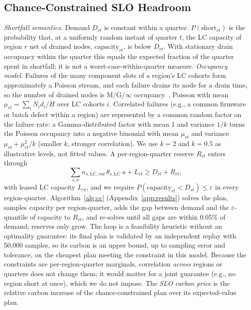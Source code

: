 \documentclass{article} %
\begin{document}
\subsection{Chance-Constrained SLO Headroom}
\label{sec:method_cc}
\emph{Shortfall semantics.} Demand $D_{rt}$ is constant within a quarter. $P(\text{short}_{rt})$ is the probability that, at a uniformly random instant of quarter $t$, the LC capacity of region $r$ net of drained nodes, $\text{capacity}_{rt}$, is below $D_{rt}$. With stationary drain occupancy within the quarter this equals the expected fraction of the quarter spent in shortfall; it is not a worst-case-within-quarter measure. \emph{Occupancy model.} Failures of the many component slots of a region's LC cohorts form approximately a Poisson stream, and each failure drains its node for a drain time, so the number of drained nodes is M/G/$\infty$ occupancy~\citep{Eick1993PhysicsMtg}, Poisson with mean $\mu_{rt} = \sum_i N_i d_i / H$ over LC cohorts $i$. Correlated failures (e.g., a common firmware or batch defect within a region) are represented by a common random factor on the failure rate: a Gamma-distributed factor with mean 1 and variance $1/k$ turns the Poisson occupancy into a negative binomial with mean $\mu_{rt}$ and variance $\mu_{rt} + \mu_{rt}^2/k$ (smaller $k$, stronger correlation). We use $k=2$ and $k=0.5$ as illustrative levels, not fitted values. A per-region-quarter reserve $R_{rt}$ enters through
\begin{equation}
\textstyle\sum_{s,a} n_{s,\text{LC},r a t}\,\theta_{s,\text{LC}}\,u + L_{rt} \ge D_{rt} + R_{rt},
\label{eq:reserve}
\end{equation}
with leased LC capacity $L_{rt}$, and we require $P(\text{capacity}_{rt} < D_{rt}) \le \varepsilon$ in every region-quarter. Algorithm~\ref{alg:cc} (Appendix~\ref{app:results}) solves the plan, samples capacity per region-quarter, adds the gap between demand and the $\varepsilon$-quantile of capacity to $R_{rt}$, and re-solves until all gaps are within 0.05\% of demand; reserves only grow. The loop is a feasibility heuristic without an optimality guarantee: its final plan is validated by an independent replay with 50,000 samples, so its carbon is an upper bound, up to sampling error and tolerance, on the cheapest plan meeting the constraint in this model. Because the constraints are per-region-quarter marginals, correlation \emph{across} regions or quarters does not change them; it would matter for a joint guarantee (e.g., no region short at once), which we do not impose. The \emph{SLO carbon price} is the relative carbon increase of the chance-constrained plan over its expected-value plan.
\end{document}
